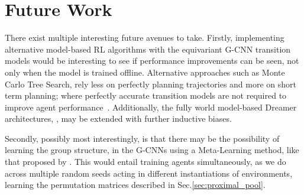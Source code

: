 \section{Future Work}
There exist multiple interesting future avenues to take. Firstly, implementing alternative model-based RL algorithms with the equivariant G-CNN transition models would be interesting to see if performance improvements can be seen, not only when the model is trained offline. Alternative approaches such as Monte Carlo Tree Search, rely less on perfectly planning trajectories and more on short term planning;
where perfectly accurate transition models are not required to improve agent performance~\cite{silver2016mastering}. Additionally, the fully world model-based Dreamer architectures, \cite{hafner2020mastering, hafner2023mastering}, may be extended with further inductive biases.

Secondly, possibly most interestingly, is that there may be the possibility of learning the group structure, in the G-CNNs using a Meta-Learning method, like that proposed by \cite{zhou2020meta}. This would entail training agents simultaneously, as we do across multiple random seeds acting in different instantiations of environments, learning the permutation matrices described in Sec.\ref{sec:proximal_pool}.

